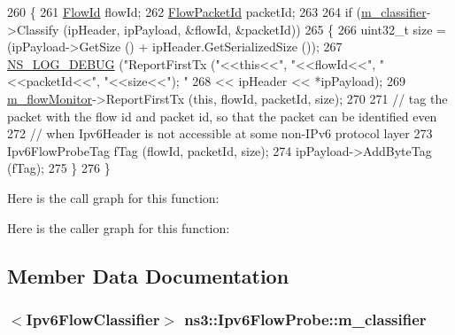 \begin{DoxyCode}
260 \{
261   \hyperlink{group__flow-monitor_ga39a766c4a370cdb9ab8ac85da4b288e9}{FlowId} flowId;
262   \hyperlink{group__flow-monitor_gaa1cb18250e1672975204f1254b8aa2ae}{FlowPacketId} packetId;
263 
264   \textcolor{keywordflow}{if} (\hyperlink{classns3_1_1Ipv6FlowProbe_a6b4af52e7aef1c6d73e4072afb734da1}{m\_classifier}->Classify (ipHeader, ipPayload, &flowId, &packetId))
265     \{
266       uint32\_t size = (ipPayload->GetSize () + ipHeader.GetSerializedSize ());
267       \hyperlink{group__logging_ga413f1886406d49f59a6a0a89b77b4d0a}{NS\_LOG\_DEBUG} (\textcolor{stringliteral}{"ReportFirstTx ("}<<\textcolor{keyword}{this}<<\textcolor{stringliteral}{", "}<<flowId<<\textcolor{stringliteral}{", "}<<packetId<<\textcolor{stringliteral}{", "}<<size<<\textcolor{stringliteral}{"); "}
268                                      << ipHeader << *ipPayload);
269       \hyperlink{classns3_1_1FlowProbe_adab205c7ab7cf4c65d72d030d8aaa82a}{m\_flowMonitor}->ReportFirstTx (\textcolor{keyword}{this}, flowId, packetId, size);
270 
271       \textcolor{comment}{// tag the packet with the flow id and packet id, so that the packet can be identified even}
272       \textcolor{comment}{// when Ipv6Header is not accessible at some non-IPv6 protocol layer}
273       Ipv6FlowProbeTag fTag (flowId, packetId, size);
274       ipPayload->AddByteTag (fTag);
275     \}
276 \}
\end{DoxyCode}


Here is the call graph for this function\+:




Here is the caller graph for this function\+:




\subsection{Member Data Documentation}
\subsubsection[{\texorpdfstring{m\+\_\+classifier}{m_classifier}}]{$<${\bf Ipv6\+Flow\+Classifier}$>$ ns3\+::\+Ipv6\+Flow\+Probe\+::m\+\_\+classifier\hspace{0.3cm}{\ttfamily [private]}}\hypertarget{classns3_1_1Ipv6FlowProbe_a6b4af52e7aef1c6d73e4072afb734da1}{}\label{classns3_1_1Ipv6FlowProbe_a6b4af52e7aef1c6d73e4072afb734da1}


